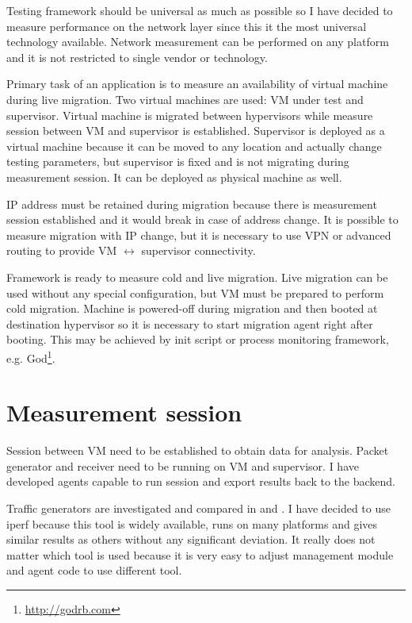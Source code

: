 
Testing framework should be universal as much as possible so I have decided to measure performance on the network layer since this it the most universal technology available. Network measurement can be performed on any platform and it is not restricted to single vendor or technology.

Primary task of an application is to measure an availability of virtual machine during live migration. Two virtual machines are used: \Ac{VM} under test and supervisor. Virtual machine is migrated between hypervisors while measure session between \Ac{VM} and supervisor is established. Supervisor is deployed as a virtual machine because it can be moved to any location and actually change testing parameters, but supervisor is fixed and is not migrating during measurement session. It can be deployed as physical machine as well.

\Ac{IP} address must be retained during migration because there is measurement session established and it would break in case of address change. It is possible to measure migration with \Ac{IP} change, but it is necessary to use \Ac{VPN} or advanced routing to provide \Ac{VM} $\leftrightarrow$ supervisor connectivity.

Framework is ready to measure cold and live migration. Live migration can be used without any special configuration, but \Ac{VM} must be prepared to perform cold migration. Machine is powered-off during migration and then booted at destination hypervisor so it is necessary to start migration agent right after booting. This may be achieved by init script or process monitoring framework, e.g. God\footnote{\url{http://godrb.com}}.

\section{Measurement session}
Session between \Ac{VM} need to be established to obtain data for analysis. Packet generator and receiver need to be running on \Ac{VM} and supervisor. I have developed agents capable to run session and export results back to the backend.

Traffic generators are investigated and compared in \cite{traffic-generators1} and \cite{traffic-generators2}. I have decided to use iperf because this tool is widely available, runs on many platforms and gives similar results as others without any significant deviation. It really does not matter which tool is used because it is very easy to adjust management module and agent code to use different tool.

